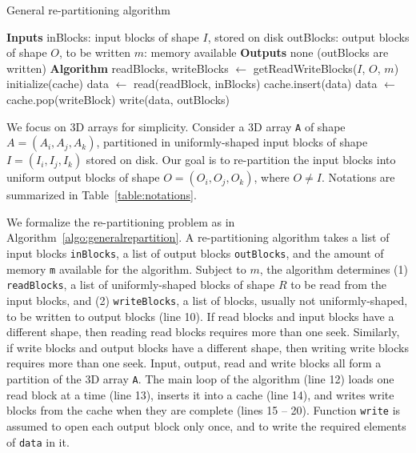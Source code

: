 \documentclass[sigconf, nonacm]{acmart}
\begin{document}
\begin{algorithm}[b]
  \caption{General re-partitioning algorithm}
  \label{algo:generalrepartition}
  \begin{algorithmic}[1]
    \STATE \textbf{Inputs}
    \STATE inBlocks: input blocks of shape $I$, stored on disk
    \STATE outBlocks: output blocks of shape $O$, to be written
    \STATE $m$: memory available
    \STATE
    \STATE \textbf{Outputs}
    \STATE none (outBlocks are written)
    \STATE
    \STATE \textbf{Algorithm}
    \STATE readBlocks, writeBlocks $\leftarrow$ getReadWriteBlocks($I$, $O$, $m$)
    \STATE initialize(cache)
      \STATE data $\leftarrow$ read(readBlock, inBlocks)
      \STATE cache.insert(data)
          \STATE data $\leftarrow$ cache.pop(writeBlock)
          \STATE write(data, outBlocks)
        \ENDIF
      \ENDFOR
    \ENDFOR

  \end{algorithmic}
\end{algorithm}

We focus on 3D arrays for simplicity. Consider a 3D array \texttt{A} of shape $A =
(A_i, A_j, A_k)$, partitioned in uniformly-shaped input blocks of shape $I =
(I_i, I_j, I_k)$ stored on disk. Our goal is to re-partition the input
blocks into uniform output blocks of shape $O = (O_i, O_j, O_k)$,
where $O \neq I$. Notations are summarized in
Table~\ref{table:notations}.

We formalize the re-partitioning problem as in Algorithm~\ref{algo:generalrepartition}.
A re-partitioning algorithm takes a
list of input blocks \texttt{inBlocks}, a list of output
blocks \texttt{outBlocks}, and the amount of memory \texttt{m}
available for the algorithm. Subject to $m$, the algorithm determines (1)
\texttt{readBlocks}, a list of uniformly-shaped blocks of shape $R$ to be read from the
input blocks, and (2) \texttt{writeBlocks}, a list of blocks,
usually not uniformly-shaped, to be written to output blocks (line 10).
If read blocks and input blocks have a different shape, then reading read blocks requires
more than one seek. Similarly, if write blocks and output blocks have a different shape,
then writing write blocks requires more than one seek. Input, output, read
and write blocks all form a partition of the 3D array \texttt{A}. The
main loop of the algorithm (line 12) loads one read block at a time (line
13), inserts it into a cache (line 14), and writes write blocks from the
cache when they are complete (lines 15 -- 20). Function \texttt{write} is assumed
to open each output block only once, and to write the required elements of \texttt{data} in it.
\end{document}
